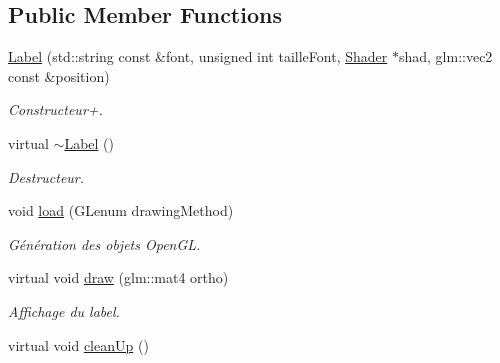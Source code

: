\subsection*{Public Member Functions}
\begin{DoxyCompactItemize}
\item 
\hypertarget{classLabel_a89439b76cefcfc6b560c2920e987072a}{\hyperlink{classLabel_a89439b76cefcfc6b560c2920e987072a}{Label} (std\-::string const \&font, unsigned int taille\-Font, \hyperlink{classShader}{Shader} $\ast$shad, glm\-::vec2 const \&position)}\label{classLabel_a89439b76cefcfc6b560c2920e987072a}

\begin{DoxyCompactList}\small\item\em Constructeur+. \end{DoxyCompactList}\item 
\hypertarget{classLabel_a39e1167a9b5827afd888780973d88894}{virtual \hyperlink{classLabel_a39e1167a9b5827afd888780973d88894}{$\sim$\-Label} ()}\label{classLabel_a39e1167a9b5827afd888780973d88894}

\begin{DoxyCompactList}\small\item\em Destructeur. \end{DoxyCompactList}\item 
\hypertarget{classLabel_a60d568210a67b61388a47fca5326beee}{void \hyperlink{classLabel_a60d568210a67b61388a47fca5326beee}{load} (G\-Lenum drawing\-Method)}\label{classLabel_a60d568210a67b61388a47fca5326beee}

\begin{DoxyCompactList}\small\item\em Génération des objets Open\-G\-L. \end{DoxyCompactList}\item 
\hypertarget{classLabel_ae8ac49d6d22dc837418dce2ea3c01637}{virtual void \hyperlink{classLabel_ae8ac49d6d22dc837418dce2ea3c01637}{draw} (glm\-::mat4 ortho)}\label{classLabel_ae8ac49d6d22dc837418dce2ea3c01637}

\begin{DoxyCompactList}\small\item\em Affichage du label. \end{DoxyCompactList}\item 
\hypertarget{classLabel_afe0eb04dde9253dae986980ab7af5e28}{virtual void \hyperlink{classLabel_afe0eb04dde9253dae986980ab7af5e28}{clean\-Up} ()}\label{classLabel_afe0eb04dde9253dae986980ab7af5e28}


\end{DoxyCompactItemize}
